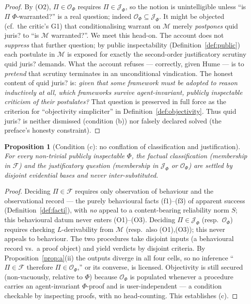 \documentclass{amsart}
\theoremstyle{definition}
\theoremstyle{plain}
\newtheorem{proposition}{Proposition}
\theoremstyle{remark}
\begin{document}
\begin{proof}
By (O2), $\Pi\in\mathcal{O}_\Phi$ requires $\Pi\in\mathcal{J}_\Phi$, so the
notion is unintelligible unless ``is $\Pi$ $\Phi$-warranted?'' is a real
question; indeed $\mathcal{O}_\Phi\subseteq\mathcal{J}_\Phi$. It might be
objected (cf.\ the critic's G1) that conditionalising warrant on $\mathcal{M}$
merely \emph{postpones} quid juris? to ``is $\mathcal{M}$ warranted?''. We meet
this head-on. The account does not \emph{suppress} that further question; by
public inspectability (Definition~\ref{def:public}) each postulate in
$\mathcal{M}$ is exposed for exactly the second-order justificatory scrutiny
quid juris? demands. What the account refuses --- correctly, given Hume --- is
to \emph{pretend} that scrutiny terminates in an unconditional vindication. The
honest content of quid juris? is: \emph{given that some framework must be
adopted to reason inductively at all, which frameworks survive agent-invariant,
publicly inspectable criticism of their postulates?} That question is preserved
in full force as the criterion for ``objectivity simpliciter'' in
Definition~\ref{def:objectivity}. Thus quid juris? is neither dismissed
(condition (b)) nor falsely declared solved (the preface's honesty
constraint).
\end{proof}

\begin{proposition}[Condition (c): no conflation of classification and
justification]\label{prop:c}
For every non-trivial publicly inspectable $\Phi$, the factual classification
(membership in $\mathcal{F}$) and the justificatory question (membership in
$\mathcal{J}_\Phi$ or $\mathcal{O}_\Phi$) are settled by disjoint evidential
bases and never inter-substituted.
\end{proposition}

\begin{proof}
Deciding $\Pi\in\mathcal{F}$ requires only observation of behaviour and the
observational record --- the purely behavioural facts (f1)--(f3) of apparent
success (Definition~\ref{def:facti}), with \emph{no} appeal to a content-bearing
reliability norm $S$; this behavioural datum never enters (O1)--(O3). Deciding $\Pi\in\mathcal{J}_\Phi$ (resp.\
$\mathcal{O}_\Phi$) requires checking $L$-derivability from $\mathcal{M}$
(resp.\ also (O1),(O3)); this never appeals to behaviour. The two procedures
take disjoint inputs (a behavioural record vs.\ a proof object) and yield
verdicts by disjoint criteria. By Proposition~\ref{prop:a}(ii) the outputs
diverge in all four cells, so no inference ``$\Pi\in\mathcal{F}$ therefore
$\Pi\in\mathcal{O}_\Phi$,'' or its converse, is licensed. Objectivity is still
secured (non-vacuously, relative to $\Phi$) because $\mathcal{O}_\Phi$ is
populated whenever a procedure carries an agent-invariant $\Phi$-proof and is
user-independent --- a condition checkable by inspecting proofs, with no
head-counting. This establishes (c).
\end{proof}
\end{document}
